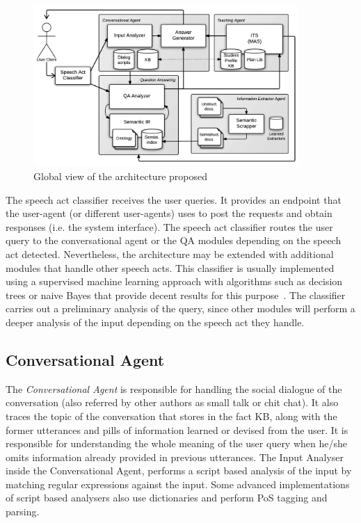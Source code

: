 \begin{figure}[!htbp]
    \centering
    \includegraphics[width=0.9\textwidth]{img/arch/global_1-3.png}
    \caption{Global view of the architecture proposed}
    \label{fig:arch1}
\end{figure}

The speech act classifier receives the user queries. It provides an endpoint that the user-agent (or different user-agents) uses to post the requests and obtain responses (i.e. the system interface). The speech act classifier routes the user query to the conversational agent or the \ac{QA} modules depending on the speech act detected. Nevertheless, the architecture may be extended with additional modules that handle other speech acts. This classifier is usually implemented using a supervised machine learning approach with algorithms such as decision trees or naive Bayes that provide decent results for this purpose~\cite{Samei2014,Moldovan2011}. The classifier carries out a preliminary analysis of the query, since other modules will perform a deeper analysis of the input depending on the speech act they handle.

\subsection{Conversational Agent}

The {\em Conversational Agent} is responsible for handling the social dialogue of the conversation (also referred by other authors as small talk or chit chat). It also traces the topic of the conversation that stores in the fact \ac{KB}, along with the former utterances and pills of information learned or devised from the user. It is responsible for understanding the whole meaning of the user query when he/she omits information already provided in previous utterances. 
The Input Analyser inside the Conversational Agent, performs a script based analysis of the input by matching regular expressions against the input. Some advanced implementations of script based analysers also use dictionaries and perform \ac{PoS} tagging and parsing.

